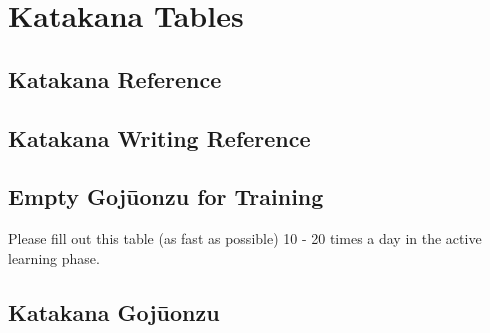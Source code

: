 \chapter{Katakana Tables}

\section{Katakana Reference}


\section{Katakana Writing Reference}


%

\newpage

\section{Empty Gojūonzu for Training}
\label{app:Leere50LauteTafel} Please fill out this table (as fast as possible)
10 - 20 times a day in the active learning phase.


\newpage\section{Katakana Gojūonzu}


%

